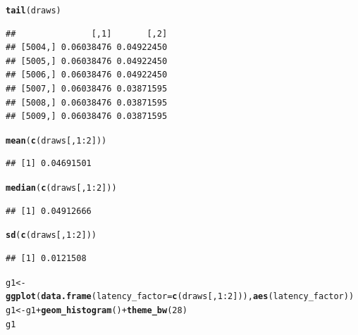 \documentclass{article}\usepackage[]{graphicx}\usepackage[]{color}
\makeatletter
\newcommand{\hlnum}[1]{\textcolor[rgb]{0.686,0.059,0.569}{#1}}%
\newcommand{\hlopt}[1]{\textcolor[rgb]{0,0,0}{#1}}%
\newcommand{\hlstd}[1]{\textcolor[rgb]{0.345,0.345,0.345}{#1}}%
\newcommand{\hlkwb}[1]{\textcolor[rgb]{0.69,0.353,0.396}{#1}}%
\newcommand{\hlkwc}[1]{\textcolor[rgb]{0.333,0.667,0.333}{#1}}%
\newcommand{\hlkwd}[1]{\textcolor[rgb]{0.737,0.353,0.396}{\textbf{#1}}}%
\newenvironment{kframe}{%
 \def\at@end@of@kframe{}%
 \ifinner\ifhmode%
  \def\at@end@of@kframe{\end{minipage}}%
  \begin{minipage}{\columnwidth}%
 \fi\fi%
 \def\FrameCommand##1{\hskip\@totalleftmargin \hskip-\fboxsep
 \colorbox{shadecolor}{##1}\hskip-\fboxsep
     \hskip-\linewidth \hskip-\@totalleftmargin \hskip\columnwidth}%
 \MakeFramed {\advance\hsize-\width
   \@totalleftmargin\z@ \linewidth\hsize
   \@setminipage}}%
 {\par\unskip\endMakeFramed%
 \at@end@of@kframe}
\newenvironment{knitrout}{}{} %
\makeatother
\begin{document}
\begin{knitrout}
\color{fgcolor}\begin{kframe}
\begin{alltt}
\hlkwd{tail}\hlstd{(draws)}
\end{alltt}
\begin{verbatim}
##               [,1]       [,2]
## [5004,] 0.06038476 0.04922450
## [5005,] 0.06038476 0.04922450
## [5006,] 0.06038476 0.04922450
## [5007,] 0.06038476 0.03871595
## [5008,] 0.06038476 0.03871595
## [5009,] 0.06038476 0.03871595
\end{verbatim}
\begin{alltt}
\hlkwd{mean}\hlstd{(}\hlkwd{c}\hlstd{(draws[,} \hlnum{1}\hlopt{:}\hlnum{2}\hlstd{]))}
\end{alltt}
\begin{verbatim}
## [1] 0.04691501
\end{verbatim}
\begin{alltt}
\hlkwd{median}\hlstd{(}\hlkwd{c}\hlstd{(draws[,} \hlnum{1}\hlopt{:}\hlnum{2}\hlstd{]))}
\end{alltt}
\begin{verbatim}
## [1] 0.04912666
\end{verbatim}
\begin{alltt}
\hlkwd{sd}\hlstd{(}\hlkwd{c}\hlstd{(draws[,} \hlnum{1}\hlopt{:}\hlnum{2}\hlstd{]))}
\end{alltt}
\begin{verbatim}
## [1] 0.0121508
\end{verbatim}
\begin{alltt}
\hlstd{g1} \hlkwb{<-} \hlkwd{ggplot}\hlstd{(}\hlkwd{data.frame}\hlstd{(}\hlkwc{latency_factor} \hlstd{=} \hlkwd{c}\hlstd{(draws[,} \hlnum{1}\hlopt{:}\hlnum{2}\hlstd{])),} \hlkwd{aes}\hlstd{(latency_factor))}
\hlstd{g1} \hlkwb{<-} \hlstd{g1} \hlopt{+} \hlkwd{geom_histogram}\hlstd{()} \hlopt{+} \hlkwd{theme_bw}\hlstd{(}\hlnum{28}\hlstd{)}
\hlstd{g1}
\end{alltt}



\end{kframe}
\end{knitrout}
\end{document}
